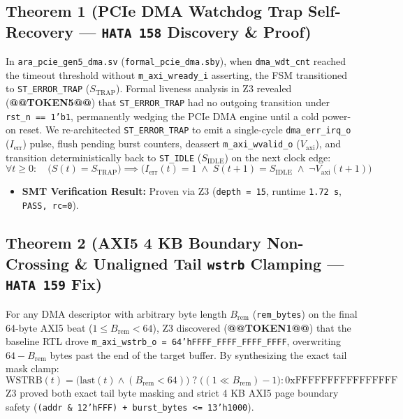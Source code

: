 \documentclass[journal,10pt,twocolumn]{IEEEtran}
\begin{document}
\subsection{Theorem 1 (PCIe DMA Watchdog Trap Self-Recovery — \texttt{HATA 158} Discovery \& Proof)}
In \texttt{ara\_pcie\_gen5\_dma.sv} (\texttt{formal\_pcie\_dma.sby}), when \texttt{dma\_wdt\_cnt} reached the timeout threshold without \texttt{m\_axi\_wready\_i} asserting, the FSM transitioned to \texttt{ST\_ERROR\_TRAP} ($S_{\mathrm{TRAP}}$). Formal liveness analysis in Z3 revealed (\textbf{@@TOKEN5@@}) that \texttt{ST\_ERROR\_TRAP} had no outgoing transition under \texttt{rst\_n == 1'b1}, permanently wedging the PCIe DMA engine until a cold power-on reset.
We re-architected \texttt{ST\_ERROR\_TRAP} to emit a single-cycle \texttt{dma\_err\_irq\_o} ($I_{\mathrm{err}}$) pulse, flush pending burst counters, deassert \texttt{m\_axi\_wvalid\_o} ($V_{\mathrm{axi}}$), and transition deterministically back to \texttt{ST\_IDLE} ($S_{\mathrm{IDLE}}$) on the next clock edge:
$$\forall t \ge 0:\quad \Big(S(t) = S_{\mathrm{TRAP}}\Big) \implies \Big(I_{\mathrm{err}}(t) = 1 \;\wedge\; S(t+1) = S_{\mathrm{IDLE}} \;\wedge\; \neg V_{\mathrm{axi}}(t+1)\Big)$$

\begin{itemize}
  \item \textbf{SMT Verification Result:} Proven via Z3 (\texttt{depth = 15}, runtime \texttt{1.72 s}, \texttt{PASS, rc=0}).
\end{itemize}

\subsection{Theorem 2 (AXI5 4 KB Boundary Non-Crossing \& Unaligned Tail \texttt{wstrb} Clamping — \texttt{HATA 159} Fix)}
For any DMA descriptor with arbitrary byte length $B_{\mathrm{rem}}$ (\texttt{rem\_bytes}) on the final 64-byte AXI5 beat ($1 \le B_{\mathrm{rem}} < 64$), Z3 discovered (\textbf{@@TOKEN1@@}) that the baseline RTL drove \texttt{m\_axi\_wstrb\_o = 64'hFFFF\_FFFF\_FFFF\_FFFF}, overwriting $64 - B_{\mathrm{rem}}$ bytes past the end of the target buffer. By synthesizing the exact tail mask clamp:
$$\mathrm{WSTRB}(t) = \big(\mathrm{last}(t) \wedge (B_{\mathrm{rem}} < 64)\big) \;?\; \big((1 \ll B_{\mathrm{rem}}) - 1\big) : \mathrm{0xFFFFFFFFFFFFFFFF}$$
Z3 proved both exact tail byte masking and strict 4 KB AXI5 page boundary safety (\texttt{(addr \& 12'hFFF) + burst\_bytes <= 13'h1000}).
\end{document}
